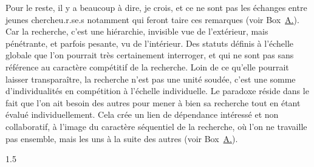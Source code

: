 Pour le reste, il y a beaucoup à dire, je crois, et ce ne sont pas les échanges entre jeunes chercheu.r.se.s notamment qui feront taire ces remarques (voir Box~\hyperref[box:GT]{\uppercase\expandafter{A\relax}.\theGT{}}). Car la recherche, c'est une hiérarchie, invisible vue de l'extérieur, mais pénétrante, et parfois pesante, vu de l'intérieur. Des statuts définis à l'échelle globale que l'on pourrait très certainement interroger, et qui ne sont pas sans référence au caractère compétitif de la recherche. Loin de ce qu'elle pourrait laisser transparaître, la recherche n'est pas une unité soudée, c'est une somme d'individualités en compétition à l'échelle individuelle. Le paradoxe réside dans le fait que l'on ait besoin des autres pour mener à bien sa recherche tout en étant évalué individuellement. Cela crée un lien de dépendance intéressé et non collaboratif, à l'image du caractère séquentiel de la recherche, où l'on ne travaille pas ensemble, mais les uns à la suite des autres (voir Box~\hyperref[box:Collaborative]{\uppercase\expandafter{A\relax}.\theCollaborative{}}).


\begin{spacing}{1.5}
~
\end{spacing}


